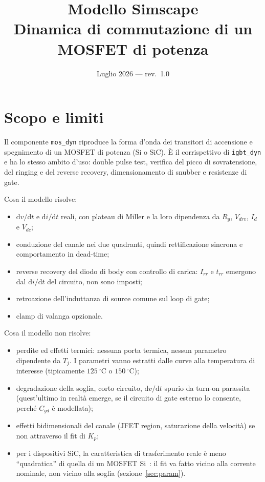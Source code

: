 \documentclass[11pt,a4paper]{article}
\title{Modello Simscape \ssc{mos\_dyn}\\
\large Dinamica di commutazione di un MOSFET di potenza}
\author{}
\date{Luglio 2026 --- rev.\ 1.0}
\newcommand{\ssc}[1]{\texttt{#1}}
\newcommand{\ud}{\mathrm{d}}
\begin{document}
\maketitle

\section{Scopo e limiti}

Il componente \ssc{mos\_dyn} riproduce la forma d'onda dei transitori di
accensione e spegnimento di un MOSFET di potenza (Si o SiC). È il
corrispettivo di \ssc{igbt\_dyn} e ha lo stesso ambito d'uso: double pulse
test, verifica del picco di sovratensione, del ringing e del reverse
recovery, dimensionamento di snubber e resistenze di gate.

\medskip
\noindent Cosa il modello risolve:
\begin{itemize}
  \item $\ud v/\ud t$ e $\ud i/\ud t$ reali, con plateau di Miller e la
        loro dipendenza da $R_g$, $V_{drv}$, $I_d$ e $V_{dc}$;
  \item conduzione del canale nei due quadranti, quindi rettificazione
        sincrona e comportamento in dead-time;
  \item reverse recovery del diodo di body con controllo di carica: $I_{rr}$
        e $t_{rr}$ emergono dal $\ud i/\ud t$ del circuito, non sono imposti;
  \item retroazione dell'induttanza di source comune sul loop di gate;
  \item clamp di valanga opzionale.
\end{itemize}

\noindent Cosa il modello non risolve:
\begin{itemize}
  \item perdite ed effetti termici: nessuna porta termica, nessun parametro
        dipendente da $T_j$. I parametri vanno estratti dalle curve alla
        temperatura di interesse (tipicamente $125\,^\circ$C o $150\,^\circ$C);
  \item degradazione della soglia, corto circuito, $\ud v/\ud t$ spurio da
        turn-on parassita (quest'ultimo in realtà emerge, se il circuito di
        gate esterno lo consente, perché $C_{gd}$ è modellata);
  \item effetti bidimensionali del canale (JFET region, saturazione della
        velocità) se non attraverso il fit di $K_p$;
  \item per i dispositivi SiC, la caratteristica di trasferimento reale è
        meno ``quadratica'' di quella di un MOSFET Si~\cite{McNutt2007,Mudholkar2014}:
        il fit va fatto
        vicino alla corrente nominale, non vicino alla soglia
        (sezione~\ref{sec:param}).
\end{itemize}
\end{document}
